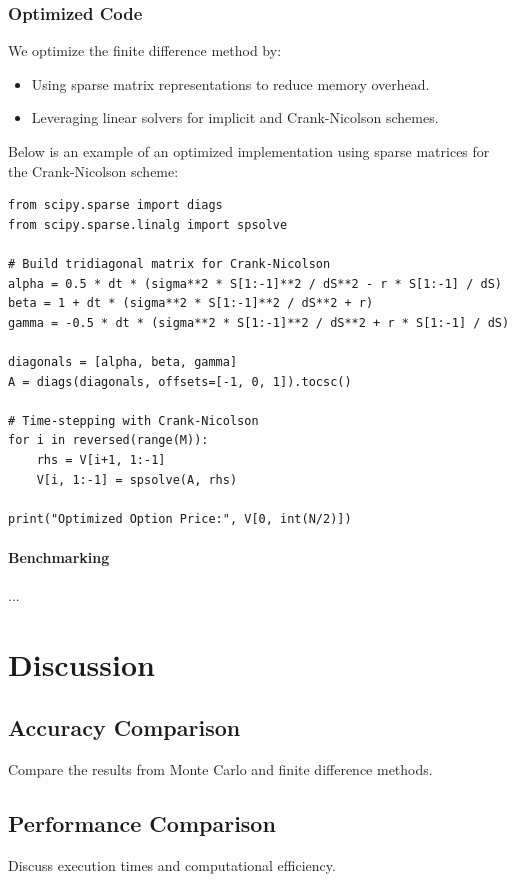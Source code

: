 \documentclass[12pt,a4paper]{report}
\begin{document}
\subsection{Optimized Code}
We optimize the finite difference method by:
\begin{itemize}
    \item Using sparse matrix representations to reduce memory overhead.
    \item Leveraging linear solvers for implicit and Crank-Nicolson schemes.
\end{itemize}

Below is an example of an optimized implementation using sparse matrices for the Crank-Nicolson scheme:

\begin{tcolorbox}[colframe=green!50!black, colback=green!5, title=Crank-Nicolson with Sparse Matrices]
\begin{verbatim}
from scipy.sparse import diags
from scipy.sparse.linalg import spsolve

# Build tridiagonal matrix for Crank-Nicolson
alpha = 0.5 * dt * (sigma**2 * S[1:-1]**2 / dS**2 - r * S[1:-1] / dS)
beta = 1 + dt * (sigma**2 * S[1:-1]**2 / dS**2 + r)
gamma = -0.5 * dt * (sigma**2 * S[1:-1]**2 / dS**2 + r * S[1:-1] / dS)

diagonals = [alpha, beta, gamma]
A = diags(diagonals, offsets=[-1, 0, 1]).tocsc()

# Time-stepping with Crank-Nicolson
for i in reversed(range(M)):
    rhs = V[i+1, 1:-1]
    V[i, 1:-1] = spsolve(A, rhs)

print("Optimized Option Price:", V[0, int(N/2)])
\end{verbatim}
\end{tcolorbox}

\subsubsection{Benchmarking}
...


\chapter{Discussion}
\section{Accuracy Comparison}
Compare the results from Monte Carlo and finite difference methods.
\section{Performance Comparison}
Discuss execution times and computational efficiency.
\end{document}
